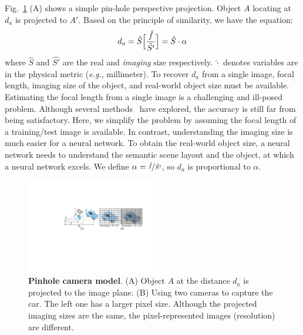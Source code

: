 Fig.~\ref{fig: pinhole camera} (A) shows a simple pin-hole perspective projection. Object $A$ locating at $d_{a}$ is projected to $A'$. 
Based on the principle of similarity, we %
have the equation:
\begin{equation}
\vspace{-1em}
    d_{a} = \hat{S} \Bigl[\frac{\hat{f}}{\hat{S'}}\Bigr]= \hat{S}\cdot \alpha
\label{eq: similarity}
\end{equation}
where $\hat{S}$ and $\hat{S'}$ are the real and \textit{imaging} size respectively. $\hat{\cdot}$ denotes variables are in the physical metric (\textit{e.g.}, millimeter). To %
recover 
$d_{a}$ from a single image, focal length, imaging size of the object, and real-world object size %
must be available. 
Estimating the focal length 
from a single image is a %
challenging 
and ill-posed problem. Although several methods~\cite{leres, hold2018perceptual} have explored,
the accuracy 
is still far from being satisfactory. 
Here, we simplify the problem by assuming 
the focal length of a training/test image is available. 
In contrast, understanding the imaging size is much easier for a neural network. To obtain the real-world object size, a neural network %
needs to 
understand the semantic scene layout and the object, at which a neural network excels. 
We %
define 
$\alpha = \nicefrac{\hat{f}}{\hat{S'}} $, so $d_{a}$ is proportional to $\alpha$. 
\begin{figure}[!b]
\vspace{-2em}
\centering
\includegraphics[width=0.5\textwidth]{./files/pinhole_difference_distances}
\caption{\textbf{Pinhole camera model}. (A) Object $A$ at the distance $d_{a}$ is projected to the image plane. (B) Using two cameras to capture the car. The left one has a larger pixel size. Although the projected imaging sizes are the same, the pixel-represented images (resolution) are different.}
\label{fig: pinhole camera}
\vspace{-0.5em}
\end{figure}

